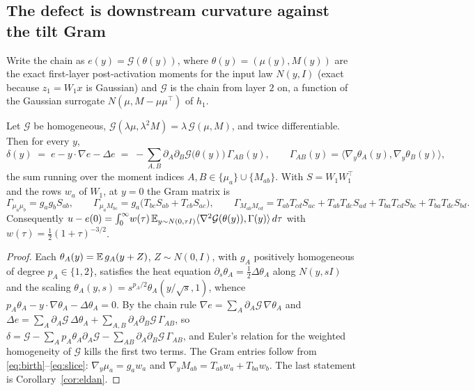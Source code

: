\subsection{The defect is downstream curvature against the tilt Gram}
Write the chain as $e(y)=\mathcal G(\theta(y))$, where $\theta(y)=(\mu(y),M(y))$ are the exact first-layer
post-activation moments for the input law $N(y,I)$ (exact because $z_1=W_1x$ is Gaussian) and $\mathcal G$ is the
chain from layer $2$ on, a function of the Gaussian surrogate $N(\mu,M-\mu\mu^\top)$ of $h_1$.
\begin{theorem}[Defect $=$ curvature $\times$ Gram]\label{thm:gram}
Let $\mathcal G$ be homogeneous, $\mathcal G(\lambda\mu,\lambda^2M)=\lambda\,\mathcal G(\mu,M)$, and twice
differentiable. Then for every $y$,
\begin{equation}\label{eq:gram}
\delta(y)\;=\;e-y\cdot\nabla e-\Delta e\;=\;-\sum_{A,B}\partial_A\partial_B\mathcal G\big(\theta(y)\big)\,\Gamma_{AB}(y),
\qquad \Gamma_{AB}(y)=\big\langle\nabla_y\theta_A(y),\nabla_y\theta_B(y)\big\rangle ,
\end{equation}
the sum running over the moment indices $A,B\in\{\mu_a\}\cup\{M_{ab}\}$. With $S=W_1W_1^\top$ and the rows $w_a$ of
$W_1$, at $y=0$ the Gram matrix is
\[
\Gamma_{\mu_a\mu_b}=g_ag_bS_{ab},\qquad
\Gamma_{\mu_aM_{bc}}=g_a\big(T_{bc}S_{ab}+T_{cb}S_{ac}\big),\qquad
\Gamma_{M_{ab}M_{cd}}=T_{ab}T_{cd}S_{ac}+T_{ab}T_{dc}S_{ad}+T_{ba}T_{cd}S_{bc}+T_{ba}T_{dc}S_{bd}.
\]
Consequently $u-e(0)=\int_0^\infty\!w(\tau)\,\mathbb E_{y\sim N(0,\tau I)}\langle\nabla^2\mathcal G(\theta(y)),\Gamma(y)\rangle\,d\tau$
with $w(\tau)=\tfrac12(1+\tau)^{-3/2}$.
\end{theorem}
\begin{proof}
Each $\theta_A(y)=\mathbb E\,g_A(y+Z)$, $Z\sim N(0,I)$, with $g_A$ positively homogeneous of degree $p_A\in\{1,2\}$,
satisfies the heat equation $\partial_s\theta_A=\tfrac12\Delta\theta_A$ along $N(y,sI)$ and the scaling
$\theta_A(y,s)=s^{p_A/2}\theta_A(y/\sqrt s,1)$, whence $p_A\theta_A-y\cdot\nabla\theta_A-\Delta\theta_A=0$. By the
chain rule $\nabla e=\sum_A\partial_A\mathcal G\,\nabla\theta_A$ and $\Delta e=\sum_A\partial_A\mathcal G\,\Delta\theta_A
+\sum_{A,B}\partial_A\partial_B\mathcal G\,\Gamma_{AB}$, so
$\delta=\mathcal G-\sum_Ap_A\theta_A\partial_A\mathcal G-\sum_{AB}\partial_A\partial_B\mathcal G\,\Gamma_{AB}$, and
Euler's relation for the weighted homogeneity of $\mathcal G$ kills the first two terms. The Gram entries follow
from \eqref{eq:birth}--\eqref{eq:slice}: $\nabla_y\mu_a=g_aw_a$ and $\nabla_yM_{ab}=T_{ab}w_a+T_{ba}w_b$. The last
statement is Corollary~\ref{cor:eldan}.
\end{proof}

